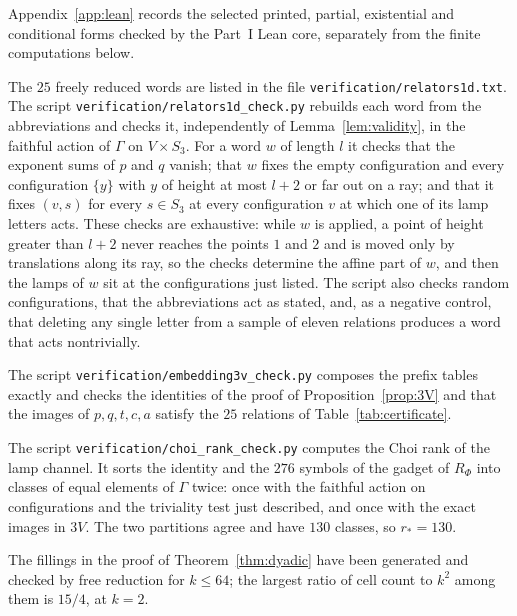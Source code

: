 Appendix~\ref{app:lean} records the selected printed, partial, existential and conditional forms checked by the Part~I Lean core, separately from the finite computations below.

The $25$ freely reduced words are listed in the file \texttt{verification/relators1d.txt}. The script \texttt{verification/relators1d\_check.py}
rebuilds each word from the abbreviations and checks it, independently of Lemma~\ref{lem:validity}, in the faithful action of $\Gamma$ on
$V\times S_3$. For a word $w$ of length $l$ it checks that the exponent sums of $p$ and $q$ vanish; that $w$ fixes the empty configuration and
every configuration $\{y\}$ with $y$ of height at most $l+2$ or far out on a ray; and that it fixes $(v,s)$ for every $s\in S_3$ at every
configuration $v$ at which one of its lamp letters acts. These checks are exhaustive: while $w$ is applied, a point of height greater than $l+2$
never reaches the points $1$ and $2$ and is moved only by translations along its ray, so the checks determine the affine part of $w$, and then
the lamps of $w$ sit at the configurations just listed. The script also checks random configurations, that the abbreviations act as stated, and,
as a negative control, that deleting any single letter from a sample of eleven relations produces a word that acts nontrivially.

The script \texttt{verification/embedding3v\_check.py} composes the prefix tables exactly and checks the identities of the proof of
Proposition~\ref{prop:3V} and
that the images of $p,q,t,c,a$ satisfy the $25$ relations of Table~\ref{tab:certificate}.

The script \texttt{verification/choi\_rank\_check.py} computes the Choi rank of the lamp channel. It sorts the identity and the $276$ symbols of
the gadget of $R_\Phi$ into classes of equal elements of $\Gamma$ twice: once with the faithful action on configurations and the triviality
test just described, and once with the exact images in $3V$. The two partitions agree and have $130$ classes, so $r_*=130$.

The fillings in the proof of Theorem~\ref{thm:dyadic} have been generated and checked by free reduction for $k\le64$; the largest ratio of cell count to $k^2$ among
them is $15/4$, at $k=2$.
